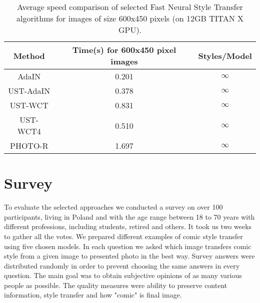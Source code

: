 \documentclass{llncs}
\begin{document}
\begin{table}[t]
\centering
\bgroup
\def\arraystretch{1.1}
\setlength\tabcolsep{2.6em}
\caption{Average speed comparison of selected Fast Neural Style Transfer algorithms for images of size 600x450 pixels (on 12GB TITAN X GPU).\label{speed:results}}
\begin{tabular}{| c | c | c |}
\hline
Method&Time(s) for 600x450 pixel images&Styles/Model\\
\hline
AdaIN&0.201&$\infty$\\
\hline

UST-AdaIN&0.378&$\infty$\\
\hline

UST-WCT&0.831&$\infty$\\
\hline

UST-WCT4&0.510&$\infty$\\
\hline

PHOTO-R&1.697&$\infty$\\
\hline

\end{tabular}

\egroup
\end{table}


\section{Survey}

To evaluate the selected approaches we conducted a survey on over 100 participants, living in Poland and with the age range between 18 to 70 years with different professions, including students, retired and others. %
It took us two weeks to gather all the votes. We prepared different examples of comic style transfer using five chosen models. In each question we asked which image transfers comic style from a given image to presented photo in the best way. Survey answers were distributed randomly in order to prevent choosing the same answers in every question. The main goal was to obtain subjective opinions of as many various people as possible. The quality measures were ability to preserve content information, style transfer and how "comic" is final image.

\end{document}
